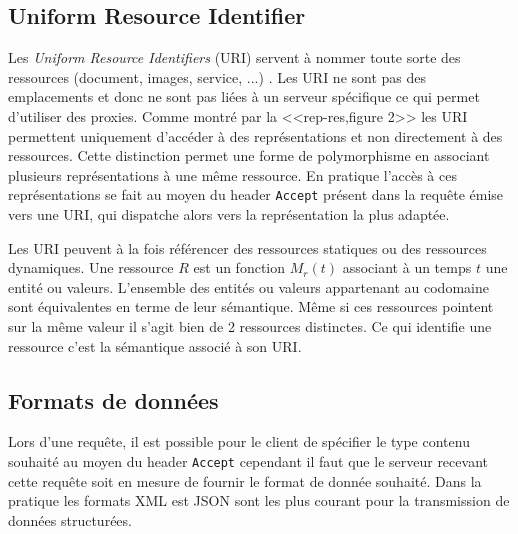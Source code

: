 \documentclass[a4paper, 11pt]{report}
\begin{document}
\subsection{Uniform Resource Identifier}

Les \emph{Uniform Resource Identifiers} (URI) servent à nommer toute
sorte des ressources (document, images, service, ...)
\cite{masinter2005uniform}.  Les URI ne sont pas des emplacements et
donc ne sont pas liées à un serveur spécifique ce qui permet
d'utiliser des proxies.  Comme montré par la <<rep-res,figure 2>> les
URI permettent uniquement d'accéder à des représentations et non
directement à des ressources.  Cette distinction permet une forme de
polymorphisme en associant plusieurs représentations à une même
ressource.  En pratique l'accès à ces représentations se fait au moyen
du header \verb=Accept= présent dans la requête émise vers une URI,
qui dispatche alors vers la représentation la plus adaptée.

\begin{center}
\end{center}

Les URI peuvent à la fois référencer des ressources statiques ou des
ressources dynamiques.  Une ressource $R$ est un fonction $M_r(t)$
associant à un temps $t$ une entité ou valeurs.  L'ensemble des
entités ou valeurs appartenant au codomaine sont équivalentes en terme
de leur sémantique.  Même si ces ressources pointent sur la même
valeur il s'agit bien de 2 ressources distinctes.  Ce qui identifie
une ressource c'est la sémantique associé à son URI.

\subsection{Formats de données}

Lors d'une requête, il est possible pour le client de spécifier le
type contenu souhaité au moyen du header \verb=Accept= cependant il
faut que le serveur recevant cette requête soit en mesure de fournir
le format de donnée souhaité.  Dans la pratique les formats XML est
JSON sont les plus courant pour la transmission de données
structurées.
\end{document}
